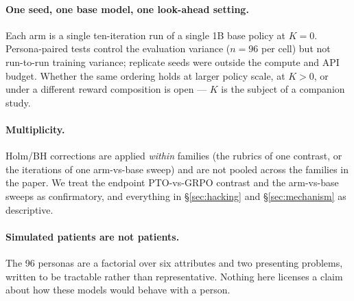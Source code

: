\paragraph{One seed, one base model, one look-ahead setting.}
Each arm is a single ten-iteration run of a single 1B base policy at $K = 0$. Persona-paired
tests control the evaluation variance ($n = 96$ per cell) but not run-to-run training
variance; replicate seeds were outside the compute and API budget. Whether the same ordering
holds at larger policy scale, at $K > 0$, or under a different reward composition is open ---
$K$ is the subject of a companion study.

\paragraph{Multiplicity.}
Holm/BH corrections are applied \emph{within} families (the rubrics of one contrast, or the
iterations of one arm-vs-base sweep) and are not pooled across the families in the paper.
We treat the endpoint PTO-vs-GRPO contrast and the arm-vs-base sweeps as confirmatory, and
everything in \S\ref{sec:hacking} and \S\ref{sec:mechanism} as descriptive.

\paragraph{Simulated patients are not patients.}
The 96 personas are a factorial over six attributes and two presenting problems, written to
be tractable rather than representative. Nothing here licenses a claim about how these
models would behave with a person.
